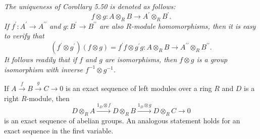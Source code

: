 \begin{note}\em
The uniqueness of Corollary 5.50 is denoted as follows: 
$$
f\otimes g:A\otimes _RB\rightarrow A^{\prime}\otimes _RB^{\prime}.
$$
If $f^\prime:A^\prime\to A^{\prime\prime}$ and $g:B^\prime\to B^{\prime\prime}$ are also $R$-module homomorphisms, then it is easy to verify that 
$$
\left( f^{\prime}\otimes g^{\prime} \right) \left( f\otimes g \right) =f^{\prime}f\otimes g^{\prime}g:A\otimes _RB\rightarrow A^{\prime\prime}\otimes _RB^{\prime\prime}.
$$
It follows readily that if $f$ and $g$ are isomorphisms, then $f\otimes g$ is a group isomorphism with inverse $f^{-1}\otimes g^{-1}$.
\end{note}
\begin{proposition}
If $A\overset{f}{\longrightarrow}B\overset{g}{\longrightarrow}C\longrightarrow 0$ is an exact sequence of left modules over a ring $R$ and $D$ is a right $R$-module, then 
$$
D\otimes _RA\overset{1_D\otimes f}{\longrightarrow}D\otimes _RB\overset{1_D\otimes g}{\longrightarrow}D\otimes _RC\longrightarrow 0
$$
is an exact sequence of abelian groups. An analogous statement holds for an exact sequence in the first variable.
\end{proposition}
